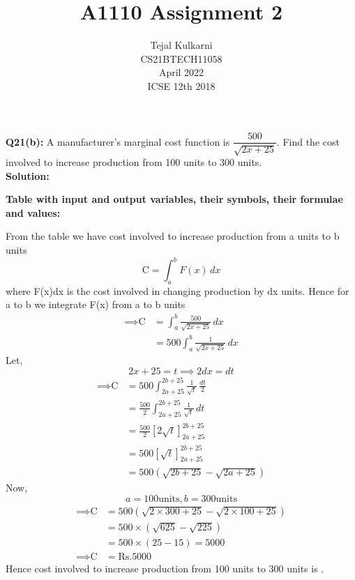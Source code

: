 \documentclass[journal,12pt,two column]{IEEEtran}
\title{A1110 Assignment 2 }
\author{Tejal Kulkarni \\ CS21BTECH11058 \\\vspace*{20pt} April 2022 \\ ICSE 12th 2018 }
\begin{document}
\providecommand{\sbrak}[1]{\ensuremath{{}\left[#1\right]}}
\newcommand{\solution}{\noindent \textbf{Solution: }}
\maketitle

\textbf{ Q21(b):} A manufacturer's marginal cost function is $\dfrac{500}{\sqrt{2x+25}}$. Find the cost involved to increase production from 100 units to 300 units.\\
\solution
\begin{table}[ht!] 
\caption{\textbf{Table with input and output variables, their symbols, their formulae and values:}}
\label{table:1}

\end{table}

From the table we have cost involved to increase production from a units to b units
\begin{equation}
\text{C} = \int_{a}^{b} F(x) \,dx    
\end{equation}
where F(x)dx is the cost involved in changing production by dx units. Hence for a to b we integrate F(x) from a to b units
\begin{align}
\implies \text{C} &= \int_{a}^{b} \frac{500}{\sqrt{2x+25}} \,dx \\
                   &= 500 \int_{a}^{b} \frac{1}{\sqrt{2x+25}} \,dx  
\end{align}
Let, 
\begin{equation}
 2x + 25 = t \implies 2dx = dt    
\end{equation}
\begin{align}
\implies \text{C} &= 500 \int_{2a+25}^{2b+25} \frac{1}{\sqrt{t}} \,\frac{dt}{2} \\
&= \frac{500}{2} \int_{2a+25}^{2b+25} \frac{1}{\sqrt{t}} \,dt \\
&= \frac{500}{2} \sbrak{2\sqrt{t}}_{2a+25}^{2b+25} \\
&= 500 \sbrak{\sqrt{t}}_{2a+25}^{2b+25} \\
&= 500(\sqrt{2b + 25} - \sqrt{2a + 25})
\end{align}
Now, 
\begin{equation} 
a = 100 \text{units} , b = 300 \text{units}
\end{equation}
\begin{align}
\implies \text{C} &= 500(\sqrt{2\times 300+25}-\sqrt{2\times 100+25})\\
                  &= 500\times(\sqrt{625} - \sqrt{225})\\
                  &= 500\times(25 - 15) = 5000 \\
\implies \text{C} &= \text{Rs.}5000
\end{align}
Hence cost involved to increase production from 100 units to 300 units is .
\end{document}
